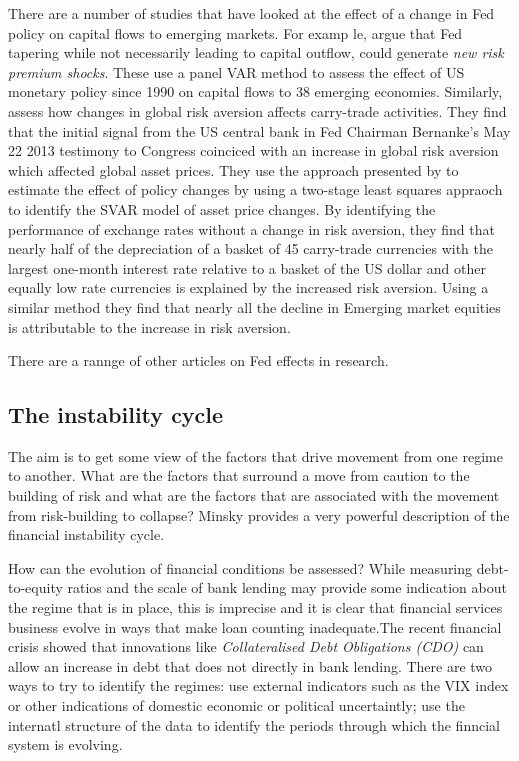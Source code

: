 \documentclass[12pt, a4paper, oneside]{article} %
\begin{document}
 There are a number of studies that have looked at the effect of a change in Fed policy on capital flows to emerging markets.  For examp le, \citet{IMFLatam} argue that Fed tapering while not necessarily leading to capital outflow, could generate \emph{new risk premium shocks}.  These use a panel VAR method to assess the effect of US monetary policy since 1990 on capital flows to 38 emerging economies.  Similarly, \citet{NYFedtaper} assess how changes in global risk aversion affects carry-trade activities.  They find that the initial signal from the US central bank in Fed Chairman Bernanke's May 22 2013 testimony to Congress coinciced with an increase in global risk aversion which affected global asset prices. They use the approach presented by \citet{MertensSVAR} to estimate the effect of policy changes by using a two-stage least squares appraoch to identify the SVAR model of asset price changes.  By identifying the performance of exchange rates without a change in risk aversion, they find that nearly half of the depreciation of a basket of 45 carry-trade currencies with the largest one-month interest rate relative to a basket of the US dollar and other equally low rate currencies is explained by the increased risk aversion. Using a similar method they find that nearly all the decline in Emerging market equities is attributable to the increase in risk aversion.
 
There are a rannge of other articles on Fed effects in research. 

\subsection{The instability cycle}
The aim is to get some view of the factors that drive movement from one regime to another.  What are the factors that surround a move from caution to the building of risk and what are the factors that are associated with the movement from risk-building to collapse?  Minsky provides a very powerful description of the financial instability cycle.  %

How can the evolution of financial conditions be assessed?  While measuring debt-to-equity ratios and the scale of bank lending may provide some indication about the regime that is in place, this is imprecise and it is clear that financial services business evolve in ways that make loan counting  inadequate.The recent financial crisis showed that innovations like \emph{Collateralised Debt Obligations (CDO)} can allow an increase in debt that does not directly in bank lending. There are two ways to try to identify the regimes: use external indicators such as the VIX index or other indications of domestic economic or political uncertaintly; use the internatl structure of the data to identify the periods through which the finncial system  is evolving. 
\end{document}
